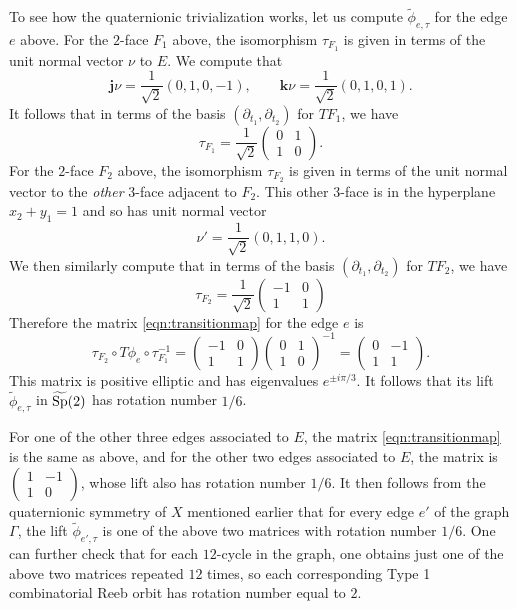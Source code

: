 To see how the quaternionic trivialization works, let us compute $\widetilde{\phi}_{e,\tau}$ for the edge $e$ above. For the $2$-face $F_1$ above, the isomorphism $\tau_{F_1}$ is given in terms of the unit normal vector $\nu$ to $E$. We compute that
\[
{\mathbf j}\nu = \frac{1}{\sqrt{2}}(0,1,0,-1),\quad\quad
{\mathbf k}\nu = \frac{1}{\sqrt{2}}(0,1,0,1).
\]
It follows that in terms of the basis $(\partial_{t_1},\partial_{t_2})$ for $TF_1$, we have
\[
\tau_{F_1} = \frac{1}{\sqrt{2}}\begin{pmatrix} 0 & 1 \\ 1 & 0 \end{pmatrix}.
\]
For the $2$-face $F_2$ above, the isomorphism $\tau_{F_2}$ is given in terms of the unit normal vector to the {\em other\/} $3$-face adjacent to $F_2$. This other $3$-face is in the hyperplane $x_2+y_1=1$ and so has unit normal vector
\[
\nu' = \frac{1}{\sqrt{2}}(0,1,1,0).
\]
We then similarly compute that in terms of the basis $(\partial_{t_1},\partial_{t_2})$ for $TF_2$, we have
\[
\tau_{F_2} = \frac{1}{\sqrt{2}}\begin{pmatrix} -1 & 0 \\ 1 & 1 \end{pmatrix}
\]
Therefore the matrix \eqref{eqn:transitionmap} for the edge $e$ is
\[
\tau_{F_2} \circ T\phi_e\circ \tau_{F_1}^{-1} = \begin{pmatrix} -1 & 0 \\ 1 & 1 \end{pmatrix} \begin{pmatrix} 0 & 1 \\ 1 & 0 \end{pmatrix}^{-1} = \begin{pmatrix} 0 & -1 \\ 1 & 1 \end{pmatrix}.
\]
This matrix is positive elliptic and has eigenvalues $e^{\pm i\pi/3}$. It follows that its lift $\widetilde{\phi}_{e,\tau}$ in $\widetilde{\operatorname{Sp}}(2)$ has rotation number $1/6$.

For one of the other three edges associated to $E$, the matrix \eqref{eqn:transitionmap} is the same as above, and for the other two edges associated to $E$, the matrix is $\begin{pmatrix} 1 & -1 \\ 1 & 0\end{pmatrix}$, whose lift also has rotation number $1/6$. It then follows from the quaternionic symmetry of $X$ mentioned earlier that for every edge $e'$ of the graph $\Gamma$, the lift $\widetilde{\phi}_{e',\tau}$ is one of the above two matrices with rotation number $1/6$. One can further check that for each $12$-cycle in the graph, one obtains just one of the above two matrices repeated $12$ times, so each corresponding Type 1 combinatorial Reeb orbit has rotation number equal to $2$.








